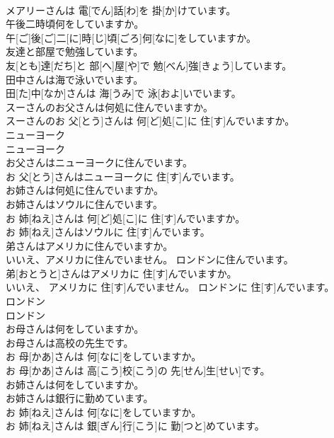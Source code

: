 \documentclass[8pt]{extreport}
\begin{document}
\begin{CJK}{UTF8}{min}
\\	メアリーさんは 電[でん]話[わ]を 掛[か]けています。
\\	午後二時頃何をしていますか。	
\\	午[ご]後[ご]二[に]時[じ]頃[ごろ]何[なに]をしていますか。
\\	友達と部屋で勉強しています。	
\\	友[とも]達[だち]と 部[へ]屋[や]で 勉[べん]強[きょう]しています。
\\	田中さんは海で泳いでいます。	
\\	田[た]中[なか]さんは 海[うみ]で 泳[およ]いでいます。
\\	スーさんのお父さんは何処に住んでいますか。	
\\	スーさんのお 父[とう]さんは 何[ど]処[こ]に 住[す]んでいますか。
\\	ニューヨーク	
\\	ニューヨーク	
\\	お父さんはニューヨークに住んでいます。	
\\	お 父[とう]さんはニューヨークに 住[す]んでいます。
\\	お姉さんは何処に住んでいますか。 
\\	お姉さんはソウルに住んでいます。	
\\	お 姉[ねえ]さんは 何[ど]処[こ]に 住[す]んでいますか。 
\\	お 姉[ねえ]さんはソウルに 住[す]んでいます。
\\	弟さんはアメリカに住んでいますか。 
\\	いいえ、アメリカに住んでいません。 ロンドンに住んでいます。	
\\	弟[おとうと]さんはアメリカに 住[す]んでいますか。 
\\	いいえ、 アメリカに 住[す]んでいません。 ロンドンに 住[す]んでいます。
\\	ロンドン	
\\	ロンドン
\\	お母さんは何をしていますか。 
\\	お母さんは高校の先生です。	
\\	お 母[かあ]さんは 何[なに]をしていますか。 
\\	お 母[かあ]さんは 高[こう]校[こう]の 先[せん]生[せい]です。
\\	お姉さんは何をしていますか。 
\\	お姉さんは銀行に勤めています。	
\\	お 姉[ねえ]さんは 何[なに]をしていますか。 
\\	お 姉[ねえ]さんは 銀[ぎん]行[こう]に 勤[つと]めています。

\end{CJK}
\end{document}
